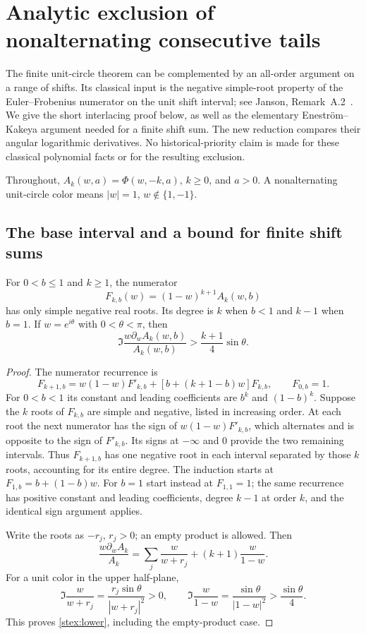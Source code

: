 \section{Analytic exclusion of nonalternating consecutive tails}
\label{stex:section}

The finite unit-circle theorem can be complemented by an all-order
argument on a range of shifts.  Its classical input is the negative
simple-root property of the Euler--Frobenius numerator on the unit shift
interval; see Janson, Remark~A.2~\cite{stex:Janson}.  We give the short
interlacing proof below, as well as the elementary Enestr\"om--Kakeya
argument needed for a finite shift sum.  The new reduction compares their
angular logarithmic derivatives.  No historical-priority claim is made
for these classical polynomial facts or for the resulting exclusion.

Throughout, $A_k(w,a)=\Phi(w,-k,a)$, $k\ge0$, and $a>0$.
A nonalternating unit-circle color means $|w|=1$, $w\notin\{1,-1\}$.

\subsection{The base interval and a bound for finite shift sums}

\begin{lemma}
\label{stex:base}
For $0<b\le1$ and $k\ge1$, the numerator
\[
 F_{k,b}(w)=(1-w)^{k+1}A_k(w,b)
\]
has only simple negative real roots.  Its degree is $k$ when $b<1$
and $k-1$ when $b=1$.  If $w=e^{i\theta}$ with $0<\theta<\pi$, then
\begin{equation}\label{stex:lower}
 \Im\frac{w\partial_w A_k(w,b)}{A_k(w,b)}
       >\frac{k+1}{4}\sin\theta.
\end{equation}
\end{lemma}
\begin{proof}
The numerator recurrence is
\[
 F_{k+1,b}=w(1-w)F'_{k,b}
            +[b+(k+1-b)w]F_{k,b},\qquad F_{0,b}=1.
\]
For $0<b<1$ its constant and leading coefficients are $b^k$ and
$(1-b)^k$.  Suppose the $k$ roots of $F_{k,b}$ are simple and negative,
listed in increasing order.  At each root the next numerator has the
sign of $w(1-w)F'_{k,b}$, which alternates and is opposite to the sign
of $F'_{k,b}$.  Its signs at $-\infty$ and $0$ provide the two remaining
intervals.  Thus $F_{k+1,b}$ has one negative root in each interval
separated by those $k$ roots, accounting for its entire degree.
The induction starts at $F_{1,b}=b+(1-b)w$.
For $b=1$ start instead at $F_{1,1}=1$; the same recurrence has
positive constant and leading coefficients, degree $k-1$ at order $k$,
and the identical sign argument applies.

Write the roots as $-r_j$, $r_j>0$; an empty product is allowed.  Then
\[
 \frac{w\partial_w A_k}{A_k}
   =\sum_j\frac{w}{w+r_j}+(k+1)\frac{w}{1-w}.
\]
For a unit color in the upper half-plane,
\[
 \Im\frac{w}{w+r_j}
       =\frac{r_j\sin\theta}{|w+r_j|^2}>0,
 \qquad
 \Im\frac{w}{1-w}=\frac{\sin\theta}{|1-w|^2}>
                              \frac{\sin\theta}{4}.
\]
This proves \eqref{stex:lower}, including the empty-product case.
\end{proof}

